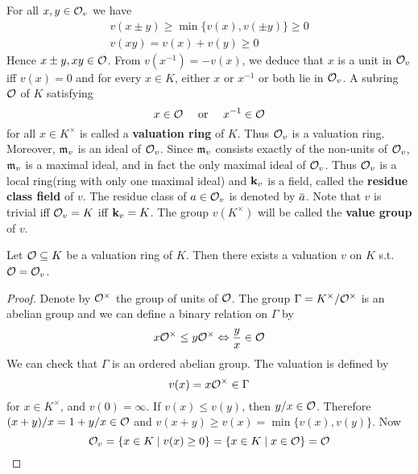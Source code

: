 \documentclass[11pt]{article}
\begin{document}
For all \(x,y\in\mathcal{O}_v\) we have
\begin{gather*}
v(x\pm y)\ge\min\{v(x),v(\pm y)\}\ge 0\\
v(xy)=v(x)+v(y)\ge 0
\end{gather*}
Hence \(x\pm y,xy\in\mathcal{O}\). From \(v(x^{-1})=-v(x)\), we deduce that \(x\) is a unit in \(\mathcal{O}_v\) iff \(v(x)=0\) and for
every \(x\in K\), either \(x\) or \(x^{-1}\) or both lie in \(\mathcal{O}_v\). A subring \(\mathcal{O}\) of \(K\)
satisfying
\begin{equation*}
x\in\mathcal{O} \quad\text{ or }\quad x^{-1}\in\mathcal{O}
\end{equation*}
for all \(x\in K^\times\) is called a \textbf{valuation ring} of \(K\). Thus \(\mathcal{O}_v\)  is a valuation ring.
Moreover, \(\mathfrak{m}_v\) is an ideal of \(\mathcal{O}_v\).
Since \(\mathfrak{m}_v\) consists exactly of the non-units of \(\mathcal{O}_v\), \(\mathfrak{m}_v\) is a
maximal ideal, and in fact the only maximal ideal of \(\mathcal{O}_v\). Thus \(\mathcal{O}_v\) is a local ring(ring
with only one maximal ideal) and \(\operatorname{\textbf{k}}_v\) is a field, called the \textbf{residue class field} of \(v\). The
residue class of \(a\in\mathcal{O}_v\) is denoted
by \(\bara\). Note that \(v\) is trivial iff \(\mathcal{O}_v=K\) iff \(\operatorname{\textbf{k}}_v=K\). The group \(v(K^\times)\)
will be called the \textbf{value group} of \(v\).

\begin{proposition}[]
Let \(\mathcal{O}\subseteq K\) be a valuation ring of \(K\). Then there exists a valuation \(v\) on \(K\) s.t. \(\mathcal{O}=\mathcal{O}_v\).
\end{proposition}

\begin{proof}
Denote by \(\mathcal{O}^\times\) the group of units of \(\mathcal{O}\). The group \(\Gamma=K^\times/\mathcal{O}^\times\) is an abelian group and
we can define a binary relation on \(\Gamma\) by
\begin{equation*}
x\mathcal{O}^\times\le y\mathcal{O}^\times\Leftrightarrow\frac{y}{x}\in\mathcal{O}
\end{equation*}
We can check that \(\Gamma\) is an ordered abelian group. The valuation is defined by
\begin{equation*}
v(x)=x\mathcal{O}^\times\in\Gamma
\end{equation*}
for \(x\in K^\times\), and \(v(0)=\infty\). If \(v(x)\le v(y)\), then \(y/x\in\mathcal{O}\). Therefore \((x+y)/x=1+y/x\in\mathcal{O}\)
and \(v(x+y)\ge v(x)=\min\{v(x),v(y)\}\). Now
\begin{equation*}
\mathcal{O}_v=\{x\in K\mid v(x)\ge 0\}=\{x\in K\mid x\in\mathcal{O}\}=\mathcal{O}
\end{equation*}
\end{proof}
\end{document}
